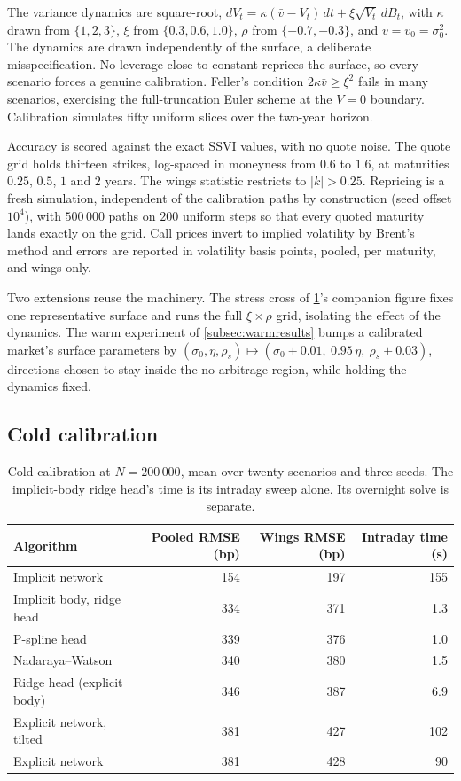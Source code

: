 \documentclass[11pt,a4paper]{article}
\theoremstyle{plain}
\theoremstyle{definition}
\theoremstyle{definition}
\newcommand{\abs}[1]{\left\lvert #1 \right\rvert}
\begin{document}
The variance dynamics are square-root, $dV_t = \kappa(\bar v - V_t)\,dt + \xi\sqrt{V_t}\,dB_t$, with $\kappa$ drawn from $\{1, 2, 3\}$, $\xi$ from $\{0.3, 0.6, 1.0\}$, $\rho$ from $\{-0.7, -0.3\}$, and $\bar v = v_0 = \sigma_0^2$. The dynamics are drawn independently of the surface, a deliberate misspecification. No leverage close to constant reprices the surface, so every scenario forces a genuine calibration. Feller's condition $2\kappa\bar v \geq \xi^2$ fails in many scenarios, exercising the full-truncation Euler scheme at the $V = 0$ boundary. Calibration simulates fifty uniform slices over the two-year horizon.

Accuracy is scored against the exact SSVI values, with no quote noise. The quote grid holds thirteen strikes, log-spaced in moneyness from $0.6$ to $1.6$, at maturities $0.25$, $0.5$, $1$ and $2$ years. The wings statistic restricts to $\abs{k} > 0.25$. Repricing is a fresh simulation, independent of the calibration paths by construction (seed offset $10^4$), with $500\,000$ paths on $200$ uniform steps so that every quoted maturity lands exactly on the grid. Call prices invert to implied volatility by Brent's method and errors are reported in volatility basis points, pooled, per maturity, and wings-only.

Two extensions reuse the machinery. The stress cross of \cref{tab:cold}'s companion figure fixes one representative surface and runs the full $\xi \times \rho$ grid, isolating the effect of the dynamics. The warm experiment of \cref{subsec:warmresults} bumps a calibrated market's surface parameters by $(\sigma_0, \eta, \rho_s) \mapsto (\sigma_0 + 0.01,\ 0.95\,\eta,\ \rho_s + 0.03)$, directions chosen to stay inside the no-arbitrage region, while holding the dynamics fixed.

\subsection{Cold calibration}\label{subsec:coldresults}

\begin{table}[h]
\centering
\begin{tabular}{lrrr}
\toprule
Algorithm & Pooled RMSE (bp) & Wings RMSE (bp) & Intraday time (s) \\
\midrule
Implicit network & 154 & 197 & 155 \\
Implicit body, ridge head & 334 & 371 & 1.3 \\
P-spline head & 339 & 376 & 1.0 \\
Nadaraya--Watson & 340 & 380 & 1.5 \\
Ridge head (explicit body) & 346 & 387 & 6.9 \\
Explicit network, tilted & 381 & 427 & 102 \\
Explicit network & 381 & 428 & 90 \\
\bottomrule
\end{tabular}
\caption{Cold calibration at $N = 200\,000$, mean over twenty scenarios and three seeds. The implicit-body ridge head's time is its intraday sweep alone. Its overnight solve is separate.}
\label{tab:cold}
\end{table}
\end{document}
